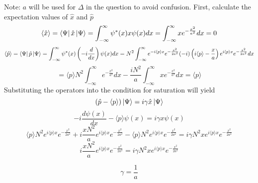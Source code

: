 \begin{sol}
Note: $a$ will be used for $\Delta$ in the question to avoid confusion.
First, calculate the expectation values of $\hat x$ and $\hat p$
$$\langle \hat x\rangle=\bra\Psi\hat x\ket\Psi=\int_{-\infty}^\infty \psi^*(x)x\psi(x)dx=\int_{-\infty}^\infty xe^{-\frac{x^2}{a^2}}dx=0$$ $$\langle \hat p\rangle=\bra\Psi\hat p\ket\Psi=\int_{-\infty}^\infty\psi^*(x)\left(-i\frac{d}{dx}\right)\psi(x)dx=N^2\int_{-\infty}^\infty e^{-i\langle p\rangle x}e^{-\frac{x^2}{2a^2}}(-i)\left(i\langle p\rangle-\frac{x}{a}\right)e^{i\langle p\rangle x}e^{-\frac{x^2}{2a^2}}dx$$  $$=\langle p\rangle N^2\int_{-\infty}^\infty e^{-\frac{x^2}{a^2}}dx-\frac{iN^2}{a}\int_{-\infty}^\infty x e^{-\frac{x^2}{a^2}}dx=\langle p\rangle $$ 
Substituting the operators into the condition for saturation will yield
$$(\hat p-\langle p\rangle)\ket\Psi=i\gamma\hat x\ket\Psi$$ 
$$-i\frac{d\psi(x)}{dx}-\langle p\rangle \psi(x)=i\gamma x\psi(x)$$ 
$$\langle p\rangle N^2e^{i\langle p\rangle x}e^{-\frac{x^2}{2a^2}}+i\frac{x N^2}{a}e^{i\langle p\rangle x}e^{-\frac{x^2}{2a^2}}-\langle p\rangle N^2 e^{i\langle p\rangle x}e^{-\frac{x^2}{2a^2}}=i\gamma  N^2x e^{i\langle p\rangle x}e^{-\frac{x^2}{2a^2}}$$ 
$$i\frac{x N^2}{a}e^{i\langle p\rangle x}e^{-\frac{x^2}{2a^2}}=i\gamma  N^2x e^{i\langle p\rangle x}e^{-\frac{x^2}{2a^2}}$$


$$\gamma=\frac{1}{a}$$ 
\end{sol}